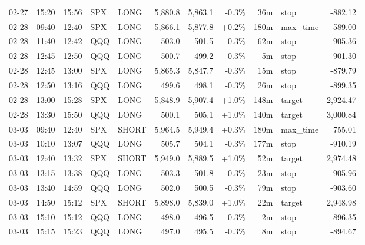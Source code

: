 \documentclass[11pt,a4paper,twoside]{article}
\begin{document}
\begin{center}
\begin{longtable}{>{\color{txtmain}}l l l l l r r r r >{\color{txtmain}}l r}
02-27 & 15:20 & 15:56 & SPX & LONG & 5,880.8 & 5,863.1 & \textcolor{lossred}{-0.3\%} & 36m & stop & \textcolor{lossred}{-882.12} \\
02-28 & 09:40 & 12:40 & SPX & LONG & 5,866.1 & 5,877.8 & \textcolor{wingreen}{+0.2\%} & 180m & max\_time & \textcolor{wingreen}{589.00} \\
02-28 & 11:40 & 12:42 & QQQ & LONG & 503.0 & 501.5 & \textcolor{lossred}{-0.3\%} & 62m & stop & \textcolor{lossred}{-905.36} \\
02-28 & 12:45 & 12:50 & QQQ & LONG & 500.7 & 499.2 & \textcolor{lossred}{-0.3\%} & 5m & stop & \textcolor{lossred}{-901.30} \\
02-28 & 12:45 & 13:00 & SPX & LONG & 5,865.3 & 5,847.7 & \textcolor{lossred}{-0.3\%} & 15m & stop & \textcolor{lossred}{-879.79} \\
02-28 & 12:50 & 13:16 & QQQ & LONG & 499.6 & 498.1 & \textcolor{lossred}{-0.3\%} & 26m & stop & \textcolor{lossred}{-899.35} \\
02-28 & 13:00 & 15:28 & SPX & LONG & 5,848.9 & 5,907.4 & \textcolor{wingreen}{+1.0\%} & 148m & target & \textcolor{wingreen}{2,924.47} \\
02-28 & 13:30 & 15:50 & QQQ & LONG & 500.1 & 505.1 & \textcolor{wingreen}{+1.0\%} & 140m & target & \textcolor{wingreen}{3,000.84} \\
03-03 & 09:40 & 12:40 & SPX & SHORT & 5,964.5 & 5,949.4 & \textcolor{wingreen}{+0.3\%} & 180m & max\_time & \textcolor{wingreen}{755.01} \\
03-03 & 10:10 & 13:07 & QQQ & LONG & 505.7 & 504.1 & \textcolor{lossred}{-0.3\%} & 177m & stop & \textcolor{lossred}{-910.19} \\
03-03 & 12:40 & 13:32 & SPX & SHORT & 5,949.0 & 5,889.5 & \textcolor{wingreen}{+1.0\%} & 52m & target & \textcolor{wingreen}{2,974.48} \\
03-03 & 13:15 & 13:38 & QQQ & LONG & 503.3 & 501.8 & \textcolor{lossred}{-0.3\%} & 23m & stop & \textcolor{lossred}{-905.96} \\
03-03 & 13:40 & 14:59 & QQQ & LONG & 502.0 & 500.5 & \textcolor{lossred}{-0.3\%} & 79m & stop & \textcolor{lossred}{-903.60} \\
03-03 & 14:50 & 15:12 & SPX & SHORT & 5,898.0 & 5,839.0 & \textcolor{wingreen}{+1.0\%} & 22m & target & \textcolor{wingreen}{2,948.98} \\
03-03 & 15:10 & 15:12 & QQQ & LONG & 498.0 & 496.5 & \textcolor{lossred}{-0.3\%} & 2m & stop & \textcolor{lossred}{-896.35} \\
03-03 & 15:15 & 15:23 & QQQ & LONG & 497.0 & 495.5 & \textcolor{lossred}{-0.3\%} & 8m & stop & \textcolor{lossred}{-894.67} \\

\end{longtable}
\end{center}
\end{document}
